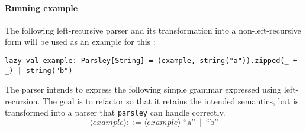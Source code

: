 \documentclass[../../main.tex]{subfiles}
\begin{document}
\paragraph{Running example}
The following left-recursive parser and its transformation into a non-left-recursive form will be used as an example for this :
\begin{verbatim}
lazy val example: Parsley[String] = (example, string("a")).zipped(_ + _) | string("b")
\end{verbatim}
%
The  parser intends to express the following simple grammar expressed using left-recursion. The goal is to refactor  so that it retains the intended semantics, but is transformed into a parser that \texttt{parsley} can handle correctly.
\begin{equation*}
  \langle \mathit{example} \rangle ::= \langle \mathit{example} \rangle \; \text{``a''} \enspace | \enspace \text{``b''}
\end{equation*}

\end{document}
